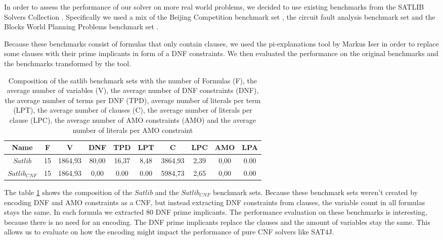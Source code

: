 In order to assess the performance of our solver on more real world problems, we decided to use existing benchmarks from the SATLIB Solvers Collection \cite{noauthor_satlib_nodate-3}. Specifically we used a mix of the Beijing Competition benchmark set \cite{noauthor_satlib_nodate}, the circuit fault analysis benchmark set \cite{noauthor_satlib_nodate-1} and the Blocks World Planning Problems benchmark set \cite{noauthor_satlib_nodate-2}.

Because these benchmarks consist of formulas that only contain clauses, we used the pi-explanations tool \cite{iser_pi-explanations_2022} by Markus Iser in order to replace some clauses with their prime implicants in form of a DNF constraints. We then evaluated the performance on the original benchmarks and the benchmarks transformed by the tool.

\begin{table}[!htb]
\centering
\caption[Composition of the satlib benchmark sets]{Composition of the satlib benchmark sets with the number of Formulas (F), the average number of variables (V), the average number of DNF constraints (DNF), the average number of terms per DNF (TPD), average number of literals per term (LPT), the average number of clauses (C), the average number of literals per clause (LPC), the average number of AMO constraints (AMO) and the average number of literals per AMO constraint}
\label{tab:satlib}
\begin{tabular}{|c|c|c|c|c|c|c|c|c|c|}
\hline
Name & F & V & DNF & TPD & LPT & C & LPC & AMO & LPA \\
\hline
$Satlib$ & 15 & 1864,93 & 80,00 & 16,37 & 8,48 & 3864,93 & 2,39 & 0,00 & 0.00 \\ 
 \hline 
$Satlib_{CNF}$ & 15 & 1864,93 & 0,00 & 0.00 & 0.00 & 5984,73 & 2,65 & 0,00 & 0.00 \\ 
 \hline 
\end{tabular}
\end{table}

The table \ref{tab:satlib} shows the composition of the $Satlib$ and the $Satlib_{CNF}$ benchmark sets. Because these benchmark sets weren't created by encoding DNF and AMO constraints as a CNF, but instead extracting DNF constraints from clauses, the variable count in all formulas stays the same. In each formula we extracted 80 DNF prime implicants. The performance evaluation on these benchmarks is interesting, because there is no need for an encoding. The DNF prime implicants replace the clauses and the amount of variables stay the same. This allows us to evaluate on how the encoding might impact the performance of pure CNF solvers like SAT4J.




